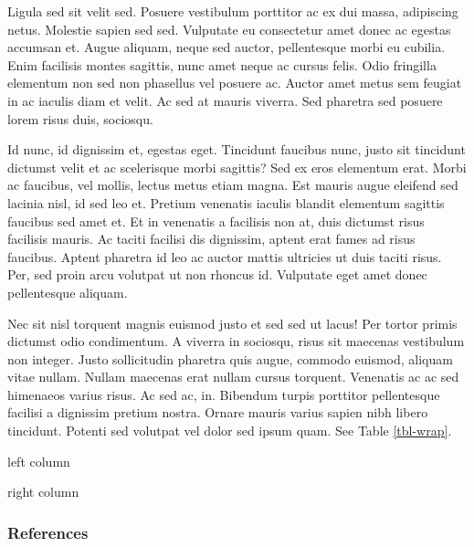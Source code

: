 \documentclass[
  9pt,
  letterpaper,
  DIV=11,
  numbers=noendperiod]{scrartcl}
\begin{document}
Ligula sed sit velit sed. Posuere vestibulum porttitor ac ex dui massa,
adipiscing netus. Molestie sapien sed sed. Vulputate eu consectetur amet
donec ac egestas accumsan et. Augue aliquam, neque sed auctor,
pellentesque morbi eu cubilia. Enim facilisis montes sagittis, nunc amet
neque ac cursus felis. Odio fringilla elementum non sed non phasellus
vel posuere ac. Auctor amet metus sem feugiat in ac iaculis diam et
velit. Ac sed at mauris viverra. Sed pharetra sed posuere lorem risus
duis, sociosqu.

Id nunc, id dignissim et, egestas eget. Tincidunt faucibus nunc, justo
sit tincidunt dictumst velit et ac scelerisque morbi sagittis? Sed ex
eros elementum erat. Morbi ac faucibus, vel mollis, lectus metus etiam
magna. Est mauris augue eleifend sed lacinia nisl, id sed leo et.
Pretium venenatis iaculis blandit elementum sagittis faucibus sed amet
et. Et in venenatis a facilisis non at, duis dictumst risus facilisis
mauris. Ac taciti facilisi dis dignissim, aptent erat fames ad risus
faucibus. Aptent pharetra id leo ac auctor mattis ultricies ut duis
taciti risus. Per, sed proin arcu volutpat ut non rhoncus id. Vulputate
eget amet donec pellentesque aliquam.

Nec sit nisl torquent magnis euismod justo et sed sed ut lacus! Per
tortor primis dictumst odio condimentum. A viverra in sociosqu, risus
sit maecenas vestibulum non integer. Justo sollicitudin pharetra quis
augue, commodo euismod, aliquam vitae nullam. Nullam maecenas erat
nullam cursus torquent. Venenatis ac ac sed himenaeos varius risus. Ac
sed ac, in. Bibendum turpis porttitor pellentesque facilisi a dignissim
pretium nostra. Ornare mauris varius sapien nibh libero tincidunt.
Potenti sed volutpat vel dolor sed ipsum quam. See Table \ref{tbl-wrap}.

\newpage{}

left column

right column

\hypertarget{references}{%
\subsubsection{References}\label{references}}
\end{document}
